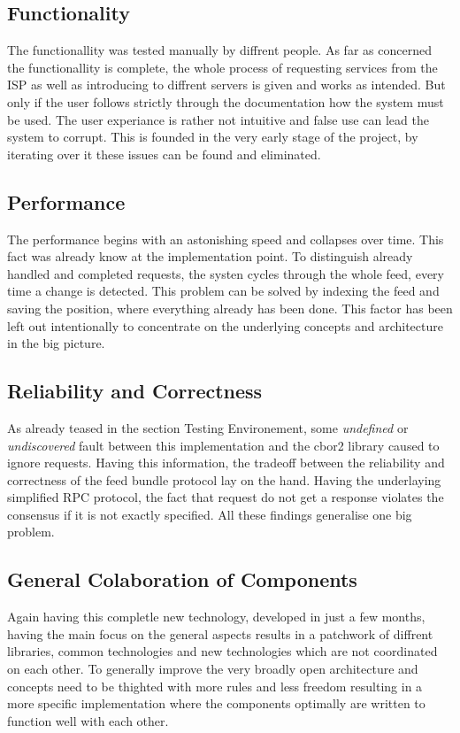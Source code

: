 \subsection{Functionality}
The functionallity was tested manually by diffrent people. As far as concerned the functionallity is complete, the whole process of requesting services from the ISP as well as introducing to diffrent servers is given and works as intended. But only if the user follows strictly through the documentation how the system must be used. The user experiance is rather not intuitive and false use can lead the system to corrupt. This is founded in the very early stage of the project, by iterating over it these issues can be found and eliminated.
\subsection{Performance}
The performance begins with an astonishing speed and collapses over time. This fact was already know at the implementation point. To distinguish already handled and completed requests, the systen cycles through the whole feed, every time a change is detected. This problem can be solved by indexing the feed and saving the position, where everything already has been done. This factor has been left out intentionally to concentrate on the underlying concepts and architecture in the big picture.
\subsection{Reliability and Correctness}
As already teased in the section Testing Environement, some \textit{undefined} or \textit{undiscovered} fault between this implementation and the cbor2 library caused to ignore requests. Having this information, the tradeoff between the reliability and correctness of the feed bundle protocol lay on the hand. Having the underlaying simplified RPC protocol, the fact that request do not get a response violates the consensus if it is not exactly specified. All these findings generalise one big problem. 

\subsection{General Colaboration of Components}
Again having this completle new technology, developed in just a few months, having the main focus on the general aspects results in a patchwork of diffrent libraries, common technologies and new technologies which are not coordinated on each other. To generally improve the very broadly open architecture and concepts need to be thighted with more rules and less freedom resulting in a more specific implementation where the components optimally are written to function well with each other.